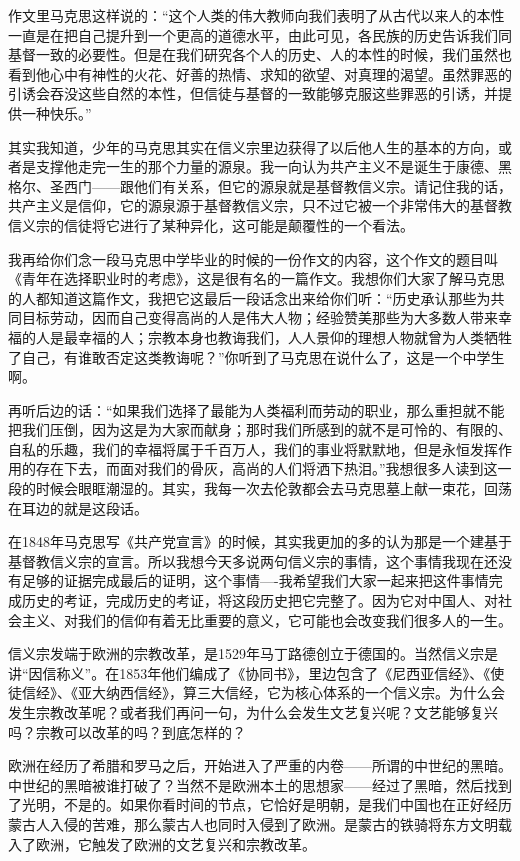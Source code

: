 \documentclass[UTF8, 12pt, a4paper]{ctexrep}
\begin{document}
作文里马克思这样说的：“这个人类的伟大教师向我们表明了从古代以来人的本性一直是在把自己提升到一个更高的道德水平，由此可见，各民族的历史告诉我们同基督一致的必要性。但是在我们研究各个人的历史、人的本性的时候，我们虽然也看到他心中有神性的火花、好善的热情、求知的欲望、对真理的渴望。虽然罪恶的引诱会吞没这些自然的本性，但信徒与基督的一致能够克服这些罪恶的引诱，并提供一种快乐。”

其实我知道，少年的马克思其实在信义宗里边获得了以后他人生的基本的方向，或者是支撑他走完一生的那个力量的源泉。我一向认为共产主义不是诞生于康德、黑格尔、圣西门——跟他们有关系，但它的源泉就是基督教信义宗。请记住我的话，共产主义是信仰，它的源泉源于基督教信义宗，只不过它被一个非常伟大的基督教信义宗的信徒将它进行了某种异化，这可能是颠覆性的一个看法。

我再给你们念一段马克思中学毕业的时候的一份作文的内容，这个作文的题目叫《青年在选择职业时的考虑》，这是很有名的一篇作文。我想你们大家了解马克思的人都知道这篇作文，我把它这最后一段话念出来给你们听：“历史承认那些为共同目标劳动，因而自己变得高尚的人是伟大人物；经验赞美那些为大多数人带来幸福的人是最幸福的人；宗教本身也教诲我们，人人景仰的理想人物就曾为人类牺牲了自己，有谁敢否定这类教诲呢？”你听到了马克思在说什么了，这是一个中学生啊。

再听后边的话：“如果我们选择了最能为人类福利而劳动的职业，那么重担就不能把我们压倒，因为这是为大家而献身；那时我们所感到的就不是可怜的、有限的、自私的乐趣，我们的幸福将属于千百万人，我们的事业将默默地，但是永恒发挥作用的存在下去，而面对我们的骨灰，高尚的人们将洒下热泪。”我想很多人读到这一段的时候会眼眶潮湿的。其实，我每一次去伦敦都会去马克思墓上献一束花，回荡在耳边的就是这段话。

在1848年马克思写《共产党宣言》的时候，其实我更加的多的认为那是一个建基于基督教信义宗的宣言。所以我想今天多说两句信义宗的事情，这个事情我现在还没有足够的证据完成最后的证明，这个事情----我希望我们大家一起来把这件事情完成历史的考证，完成历史的考证，将这段历史把它完整了。因为它对中国人、对社会主义、对我们的信仰有着无比重要的意义，它可能也会改变我们很多人的一生。

信义宗发端于欧洲的宗教改革，是1529年马丁路德创立于德国的。当然信义宗是讲“因信称义”。在1853年他们编成了《协同书》，里边包含了《尼西亚信经》、《使徒信经》、《亚大纳西信经》，算三大信经，它为核心体系的一个信义宗。为什么会发生宗教改革呢？或者我们再问一句，为什么会发生文艺复兴呢？文艺能够复兴吗？宗教可以改革的吗？到底怎样的？

欧洲在经历了希腊和罗马之后，开始进入了严重的内卷——所谓的中世纪的黑暗。中世纪的黑暗被谁打破了？当然不是欧洲本土的思想家——经过了黑暗，然后找到了光明，不是的。如果你看时间的节点，它恰好是明朝，是我们中国也在正好经历蒙古人入侵的苦难，那么蒙古人也同时入侵到了欧洲。是蒙古的铁骑将东方文明载入了欧洲，它触发了欧洲的文艺复兴和宗教改革。
\end{document}
